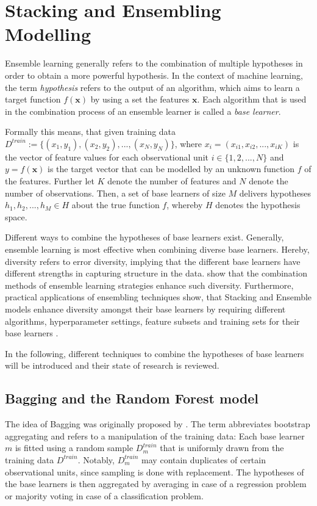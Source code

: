 \documentclass[12pt]{article}
\begin{document}

\section{Stacking and Ensembling Modelling}
Ensemble learning generally refers to the combination of multiple hypotheses in order to obtain a more powerful hypothesis. In the context of machine learning, the term \textit{hypothesis} refers to the output of an algorithm, which aims to learn a target function $f(\mathbf{x})$ by using a set the features $\mathbf{x}$. Each algorithm that is used in the combination process of an ensemble learner is called a \textit{base learner}.

Formally this means, that given training data $D^{train} := \{(x_1, y_1), (x_2, y_2),..., (x_N, y_N)\}$, where $x_i = (x_{i1}, x_{i2},..., x_{iK})$ is the vector of feature values for each observational unit $i \in \{1, 2,..., N\}$ and $y = f(\mathbf{x})$ is the target vector that can be modelled by an unknown function $f$ of the features. Further let $K$ denote the number of features and $N$ denote the number of observations. Then, a set of base learners of size $M$ delivers hypotheses $h_1, h_2,..., h_M \in H$ about the true function $f$, whereby $H$ denotes the hypothesis space.

Different ways to combine the hypotheses of base learners exist. Generally, ensemble learning is most effective when combining diverse base learners. Hereby, diversity refers to error diversity, implying that the different base learners have different strengths in capturing structure in the data. \cite{brown2005diversity} show that the combination methods of ensemble learning strategies enhance such diversity. Furthermore, practical applications of ensembling techniques show, that Stacking and Ensemble models enhance diversity amongst their base learners by requiring different algorithms, hyperparameter settings, feature subsets and training sets for their base learners \citep{online2017stacking}. 

In the following, different techniques to combine the hypotheses of base learners will be introduced and their state of research is reviewed. 

\subsection{Bagging and the Random Forest model}
The idea of Bagging was originally proposed by \cite{breiman1996bagging}. The term abbreviates bootstrap aggregating and refers to a manipulation of the training data: Each base learner $m$ is fitted using a random sample $D^{train}_m$ that is uniformly drawn from the training data $D^{train}$. Notably, $D^{train}_m$ may contain duplicates of certain observational units, since sampling is done with replacement. The hypotheses of the base learners is then aggregated by averaging in case of a regression problem or majority voting in case of a classification problem. 
\end{document}
